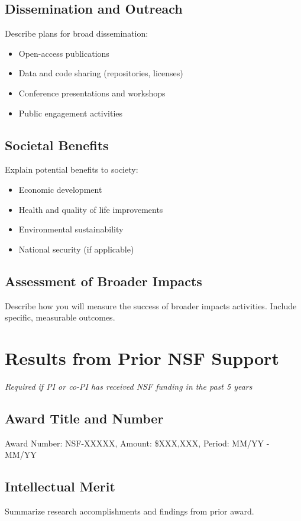 \documentclass[11pt,letterpaper]{article}
\begin{document}
\subsection{Dissemination and Outreach}
Describe plans for broad dissemination:
\begin{itemize}
    \item Open-access publications
    \item Data and code sharing (repositories, licenses)
    \item Conference presentations and workshops
    \item Public engagement activities
\end{itemize}

\subsection{Societal Benefits}
Explain potential benefits to society:
\begin{itemize}
    \item Economic development
    \item Health and quality of life improvements
    \item Environmental sustainability
    \item National security (if applicable)
\end{itemize}

\subsection{Assessment of Broader Impacts}
Describe how you will measure the success of broader impacts activities. Include specific, measurable outcomes.

\section{Results from Prior NSF Support}
\textit{Required if PI or co-PI has received NSF funding in the past 5 years}

\subsection{Award Title and Number}
Award Number: NSF-XXXXX, Amount: \$XXX,XXX, Period: MM/YY - MM/YY

\subsection{Intellectual Merit}
Summarize research accomplishments and findings from prior award.
\end{document}
